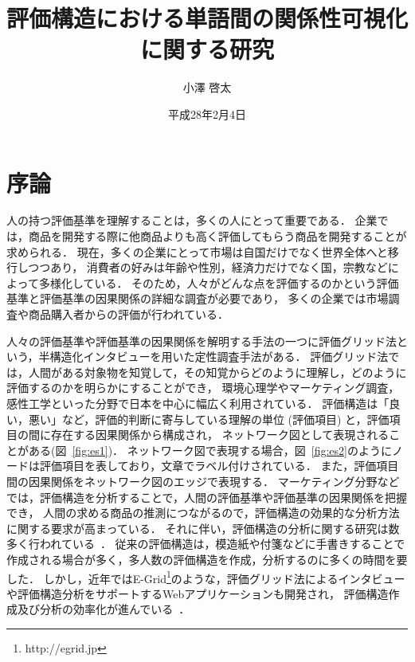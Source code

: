 \documentclass[syuuron]{kuee}
\title{評価構造における単語間の関係性可視化に関する研究}
\author{小澤 啓太}
\date{平成28年2月4日}
\begin{document}
\maketitle
\tableofcontents


\chapter{序論}
	人の持つ評価基準を理解することは，多くの人にとって重要である．
	企業では，商品を開発する際に他商品よりも高く評価してもらう商品を開発することが求められる．
	現在，多くの企業にとって市場は自国だけでなく世界全体へと移行しつつあり，
	消費者の好みは年齢や性別，経済力だけでなく国，宗教などによって多様化している．
	そのため，人々がどんな点を評価するのかという評価基準と評価基準の因果関係の詳細な調査が必要であり，
	多くの企業では市場調査や商品購入者からの評価が行われている．
	
	人々の評価基準や評価基準の因果関係を解明する手法の一つに評価グリッド法という，半構造化インタビューを用いた定性調査手法がある．
	評価グリッド法では，人間がある対象物を知覚して，その知覚からどのように理解し，どのように評価するのかを明らかにすることができ，
	環境心理学やマーケティング調査，感性工学といった分野で日本を中心に幅広く利用されている\cite{sen1}．
	評価構造は「良い，悪い」など，評価的判断に寄与している理解の単位 (評価項目) と，評価項目の間に存在する因果関係から構成され，
	ネットワーク図として表現されることがある(図~\ref{fig:es1})．
	ネットワーク図で表現する場合，図~\ref{fig:es2}のようにノードは評価項目を表しており，文章でラベル付けされている．
	また，評価項目間の因果関係をネットワーク図のエッジで表現する．
	マーケティング分野などでは，評価構造を分析することで，人間の評価基準や評価基準の因果関係を把握でき，
	人間の求める商品の推測につながるので，評価構造の効果的な分析方法に関する要求が高まっている\cite{egm6}\cite{egm7}．
	それに伴い，評価構造の分析に関する研究は数多く行われている~\cite{egm8}\cite{egm9}．
	従来の評価構造は，模造紙や付箋などに手書きすることで作成される場合が多く，多人数の評価構造を作成，分析するのに多くの時間を要した．
	しかし，近年ではE-Grid\footnote{http://egrid.jp}のような，評価グリッド法によるインタビューや評価構造分析をサポートするWebアプリケーションも開発され，
	評価構造作成及び分析の効率化が進んでいる~\cite{egm6}\cite{egm10}．
	
\end{document}
